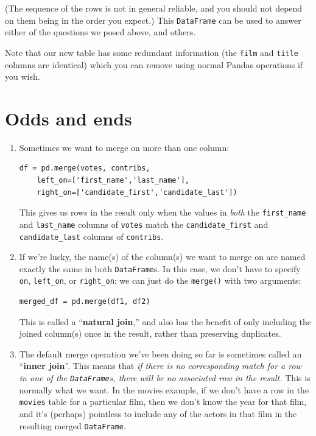 (The sequence of the rows is not in general reliable, and you should not depend
on them being in the order you expect.) This \texttt{DataFrame} can be used to
answer either of the questions we posed above, and others.

Note that our new table has some redundant information (the \texttt{film} and
\texttt{title} columns are identical) which you can remove using normal Pandas
operations if you wish.

\section{Odds and ends}

\begin{enumerate}
\item Sometimes we want to merge on more than one column:

\begin{Verbatim}[fontsize=\small,samepage=true,frame=single,framesep=3mm]
df = pd.merge(votes, contribs,
    left_on=['first_name','last_name'],
    right_on=['candidate_first','candidate_last'])
\end{Verbatim}

This gives us rows in the result only when the values in \textit{both} the
\texttt{first\_name} and \texttt{last\_name} columns of \texttt{votes} match
the \texttt{candidate\_first} and \texttt{candidate\_last} columns of
\texttt{contribs}.

\item If we're lucky, the name(s) of the column(s) we want to merge on are
named exactly the same in both \texttt{DataFrame}s. In this case, we don't have
to specify \texttt{on}, \texttt{left\_on}, or \texttt{right\_on}: we can just
do the \texttt{merge()} with two arguments:

\begin{Verbatim}[fontsize=\small,samepage=true,frame=single,framesep=3mm]
merged_df = pd.merge(df1, df2)
\end{Verbatim}


This is called a ``\textbf{natural join},'' and also has the benefit of only
including the joined column(s) once in the result, rather than preserving
duplicates.



\item The default merge operation we've been doing so far is sometimes called
an ``\textbf{inner join}''. This means that \textit{if there is no
corresponding match for a row in one of the \texttt{DataFrame}s, there will be
no associated row in the result.} This is normally what we want. In the movies
example, if we don't have a row in the \texttt{movies} table for a particular
film, then we don't know the year for that film, and it's (perhaps) pointless
to include any of the actors in that film in the resulting merged \texttt{DataFrame}.


\end{enumerate}
